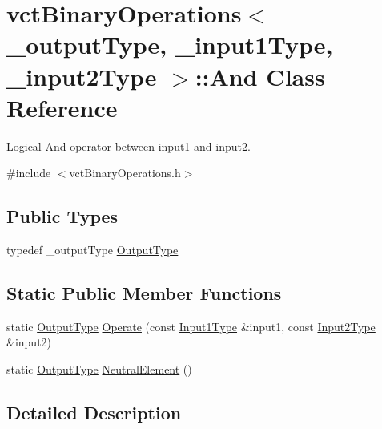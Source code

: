 \hypertarget{classvct_binary_operations_1_1_and}{}\section{vct\+Binary\+Operations$<$ \+\_\+output\+Type, \+\_\+input1\+Type, \+\_\+input2\+Type $>$\+:\+:And Class Reference}
\label{classvct_binary_operations_1_1_and}


Logical \hyperlink{classvct_binary_operations_1_1_and}{And} operator between input1 and input2.  




{\ttfamily \#include $<$vct\+Binary\+Operations.\+h$>$}

\subsection*{Public Types}
\begin{DoxyCompactItemize}
\item 
typedef \+\_\+output\+Type \hyperlink{classvct_binary_operations_1_1_and_a266e94b9b9630c9e1f7527e5083c1384}{Output\+Type}
\end{DoxyCompactItemize}
\subsection*{Static Public Member Functions}
\begin{DoxyCompactItemize}
\item 
static \hyperlink{classvct_binary_operations_1_1_and_a266e94b9b9630c9e1f7527e5083c1384}{Output\+Type} \hyperlink{classvct_binary_operations_1_1_and_a30145d7977429d65ca1706d876d528ec}{Operate} (const \hyperlink{classvct_binary_operations_a5e56a66a012d6a28c539a08a0021c45e}{Input1\+Type} \&input1, const \hyperlink{classvct_binary_operations_a929119af557a04a16b4d854981e49e1b}{Input2\+Type} \&input2)
\item 
static \hyperlink{classvct_binary_operations_1_1_and_a266e94b9b9630c9e1f7527e5083c1384}{Output\+Type} \hyperlink{classvct_binary_operations_1_1_and_a6f5b7a04f80a8501d5423983957eecb7}{Neutral\+Element} ()
\end{DoxyCompactItemize}


\subsection{Detailed Description}
